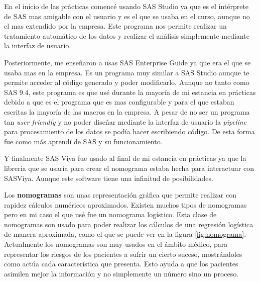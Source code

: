 \documentclass[pdftex,11pt,a4paper]{book}
\begin{document}
En el inicio de las prácticas comencé usando SAS Studio ya que es el intérprete de SAS mas amigable con el usuario y es el que se usaba en el curso, aunque no el mas extendido por la empresa. Este programa nos permite realizar un tratamiento automático de los datos y realizar el análisis simplemente mediante la interfaz de usuario. 

Posteriormente, me enseñaron a usas SAS Enterprise Guide ya que era el que se usaba mas en la empresa. Es un programa muy similar a SAS Studio aunque te permite acceder al código generado y poder modificarlo. Aunque no tanto como SAS 9.4, este programa es que usé durante la mayoría de mi estancia en prácticas debido a que es el programa que es mas configurable y para el que estaban escritas la mayoría de las macros en la empresa. A pesar de no ser un programa tan \textit{user friendly} y no poder diseñar mediante la interfaz de usuario la \textit{pipeline} para procesamiento de los datos se podía hacer escribiendo código. De esta forma fue como más aprendí de SAS y su funcionamiento. 

Y finalmente SAS Viya fue usado al final de mi estancia en prácticas ya que la librería que se usaría para crear el nomograma estaba hecha para interactuar con SASViya. Aunque este software tiene una infinitud de posibilidades. 

Los \textbf{nomogramas} son unas representación gráfica que permite realizar con rapidez cálculos numéricos aproximados. Existen muchos tipos de nomogramas pero en mi caso el que usé fue un nomograma logístico. Esta clase de nomogramas son usado para poder realizar los cálculos de una regresión logística de manera aproximada, como el que se puede ver en la figura \ref{fig:nomograma}. Actualmente  los nomogramas son muy usados en el ámbito médico, para representar los riesgos de los pacientes a sufrir un cierto suceso, mostrándoles como actúa cada característica que presenta. Esto ayuda a que los pacientes asimilen mejor la información y no simplemente un número sino un proceso.  
\end{document}
